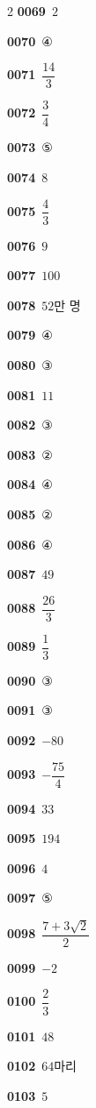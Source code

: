 \documentclass[10pt,a4paper]{article}
\begin{document}
\begin{multicols}{2}
\noindent\textbf{0069}\ $2$\par
\noindent\textbf{0070}\ ④\par
\noindent\textbf{0071}\ $\dfrac{14}{3}$\par
\noindent\textbf{0072}\ $\dfrac{3}{4}$\par
\noindent\textbf{0073}\ ⑤\par
\noindent\textbf{0074}\ $8$\par
\noindent\textbf{0075}\ $\dfrac{4}{3}$\par
\noindent\textbf{0076}\ $9$\par
\noindent\textbf{0077}\ $100$\par
\noindent\textbf{0078}\ $52$만 명\par
\noindent\textbf{0079}\ ④\par
\noindent\textbf{0080}\ ③\par
\noindent\textbf{0081}\ $11$\par
\noindent\textbf{0082}\ ③\par
\noindent\textbf{0083}\ ②\par
\noindent\textbf{0084}\ ④\par
\noindent\textbf{0085}\ ②\par
\noindent\textbf{0086}\ ④\par
\noindent\textbf{0087}\ $49$\par
\noindent\textbf{0088}\ $\dfrac{26}{3}$\par
\noindent\textbf{0089}\ $\dfrac{1}{3}$\par
\noindent\textbf{0090}\ ③\par
\noindent\textbf{0091}\ ③\par
\noindent\textbf{0092}\ $-80$\par
\noindent\textbf{0093}\ $-\dfrac{75}{4}$\par
\noindent\textbf{0094}\ $33$\par
\noindent\textbf{0095}\ $194$\par
\noindent\textbf{0096}\ $4$\par
\noindent\textbf{0097}\ ⑤\par
\noindent\textbf{0098}\ $\dfrac{7+3\sqrt{2}}{2}$\par
\noindent\textbf{0099}\ $-2$\par
\noindent\textbf{0100}\ $\dfrac{2}{3}$\par
\noindent\textbf{0101}\ $48$\par
\noindent\textbf{0102}\ $64$마리\par
\noindent\textbf{0103}\ $5$\par

\end{multicols}
\end{document}
